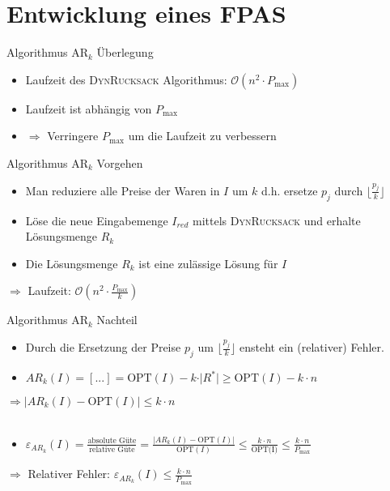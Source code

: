 \section{Entwicklung eines FPAS}
\begin{frame}{Algorithmus $\text{AR}_k$ Überlegung}	
	\begin{itemize}
		\item 
		Laufzeit des \textsc{DynRucksack} Algorithmus: $\mathcal O(n^2 \cdot P_{\max})$ 
		\item
		Laufzeit ist abhängig von $P_{\max}$
		\item
		$\Rightarrow$ Verringere $P_{\max}$ um die Laufzeit zu verbessern
	\end{itemize}
\end{frame}
\begin{frame}{Algorithmus $\text{AR}_k$ Vorgehen}	
	\begin{itemize}
		\item 
		Man reduziere alle Preise der Waren in $I$ um $k$ d.h. ersetze $p_j$ durch $\displaystyle \lfloor \frac {p_j}{k} \rfloor $
		\item
		Löse die neue Eingabemenge $I_{red}$ mittels \textsc{DynRucksack} und erhalte Lösungsmenge $R_k$
		\item
		Die Lösungsmenge $R_k$ ist eine zulässige Lösung für $I$
		
	\end{itemize}
	$\Rightarrow$ Laufzeit: $\displaystyle \mathcal O(n^2 \cdot \frac{P_{\max}}{k})$
\end{frame}

\begin{frame}{Algorithmus $\text{AR}_k$ Nachteil}	
	\begin{itemize}
		\item 
		Durch die Ersetzung der Preise $p_j$ um $\displaystyle \lfloor \frac {p_j}{k} \rfloor $ ensteht ein (relativer) Fehler.
		\item
		$AR_k(I) = [...] = \text{OPT}(I) - k \cdot \vert R^* \vert \ge \text{OPT}(I) - k \cdot n$
	\end{itemize}
	$\Rightarrow \vert AR_k(I) - \text{OPT}(I) \vert \le k \cdot n$
	\\~\\
	\begin{itemize}
		\item
		$\displaystyle \varepsilon_{AR_k}(I) = \frac {\text{absolute Güte}} {\text{relative Güte}} = \frac{\vert AR_k(I) - \text{OPT}(I) \vert}{\text{OPT}(I)} \le \frac{k \cdot  n}{\text{OPT(I)}} \le \frac{k \cdot n}{P_{\max}}$
	\end{itemize}
	$\Rightarrow$ Relativer Fehler: $\displaystyle \varepsilon_{AR_k}(I) \le \frac{k \cdot n}{P_{\max}}$
\end{frame}

